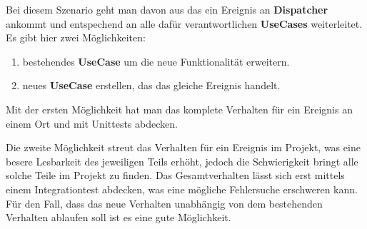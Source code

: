 
    Bei diesem Szenario geht man davon aus das ein Ereignis an \textbf{Dispatcher} ankommt und entspechend an alle dafür 
    verantwortlichen \textbf{UseCases} weiterleitet. 
    Es gibt hier zwei Möglichkeiten:
    \begin{enumerate}
        \item bestehendes \textbf{UseCase} um die neue Funktionalität erweitern.
        \item neues \textbf{UseCase}  erstellen, das das gleiche Ereignis handelt.
    \end{enumerate}

    Mit der ersten Möglichkeit hat man das komplete Verhalten für ein Ereignis an einem Ort und mit Unittests abdecken.

    Die zweite Möglichkeit streut das Verhalten für ein Ereignis im Projekt, was eine besere Lesbarkeit des jeweiligen Teils erhöht,
    jedoch die Schwierigkeit bringt alle solche Teile im Projekt zu finden. Das Gesamtverhalten lässt sich erst mittels
    einem Integrationtest abdecken, was eine mögliche Fehlersuche erschweren kann. 
    Für den Fall, dass das neue Verhalten unabhängig von dem bestehenden Verhalten ablaufen soll ist es eine gute Möglichkeit.